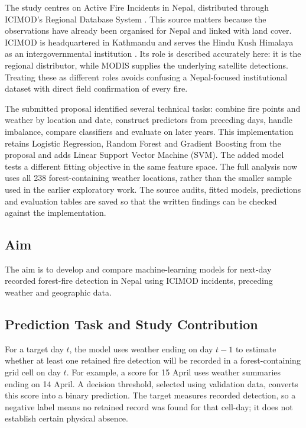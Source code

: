 \documentclass[conference,a4paper]{IEEEtran}
\begin{document}
The study centres on Active Fire Incidents in Nepal, distributed through ICIMOD's Regional Database System \citep{icimodfire}. This source matters because the observations have already been organised for Nepal and linked with land cover. ICIMOD is headquartered in Kathmandu and serves the Hindu Kush Himalaya as an intergovernmental institution \citep{icimodabout}. Its role is described accurately here: it is the regional distributor, while MODIS supplies the underlying satellite detections. Treating these as different roles avoids confusing a Nepal-focused institutional dataset with direct field confirmation of every fire.

The submitted proposal identified several technical tasks: combine fire points and weather by location and date, construct predictors from preceding days, handle imbalance, compare classifiers and evaluate on later years. This implementation retains Logistic Regression, Random Forest and Gradient Boosting from the proposal and adds Linear Support Vector Machine (SVM). The added model tests a different fitting objective in the same feature space. The full analysis now uses all 238 forest-containing weather locations, rather than the smaller sample used in the earlier exploratory work. The source audits, fitted models, predictions and evaluation tables are saved so that the written findings can be checked against the implementation.

\subsection{Aim}
The aim is to develop and compare machine-learning models for next-day recorded forest-fire detection in Nepal using ICIMOD incidents, preceding weather and geographic data.

\subsection{Prediction Task and Study Contribution}
For a target day $t$, the model uses weather ending on day $t-1$ to estimate whether at least one retained fire detection will be recorded in a forest-containing grid cell on day $t$. For example, a score for 15 April uses weather summaries ending on 14 April. A decision threshold, selected using validation data, converts this score into a binary prediction. The target measures recorded detection, so a negative label means no retained record was found for that cell-day; it does not establish certain physical absence.
\end{document}
